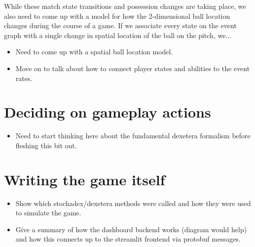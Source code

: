 While these match state transitions and possession changes are taking place, we also need to come up with a model for how the 2-dimensional ball location changes during the course of a game. If we associate every state on the event graph with a single change in spatial location of the ball on the pitch, we...


\begin{itemize}
\item{Need to come up with a spatial ball location model.}
\item{Move on to talk about how to connect player states and abilities to the event rates.}
\end{itemize}

\section{\sffamily Deciding on gameplay actions}


\begin{itemize}
\item{Need to start thinking here about the fundamental dexetera formalism before fleshing this bit out.}
\end{itemize}

\section{\sffamily Writing the game itself}

\begin{itemize}
\item{Show which stochadex/dexetera methods were called and how they were used to simulate the game.}
\item{Give a summary of how the dashboard backend works (diagram would help) and how this connects up to the streamlit frontend via protobuf messages.}
\end{itemize}